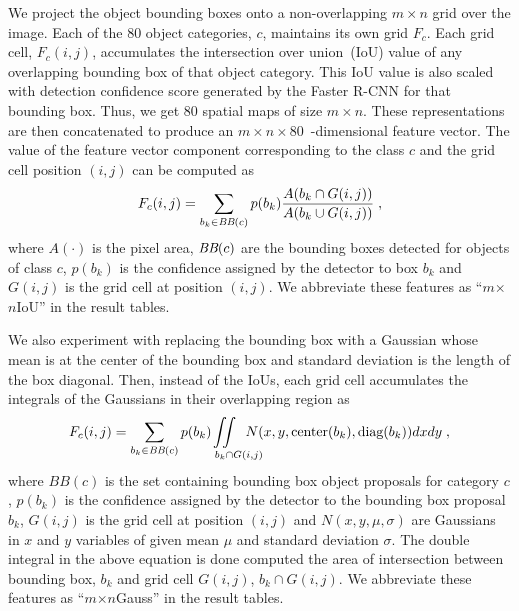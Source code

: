 We project the object bounding boxes onto a non-overlapping $m \times n$ grid
over the image.
Each of the 80 object categories, $c$, maintains its own grid $F_c$.
Each grid cell, $F_c(i,j)$, accumulates the intersection over union~(IoU) value
of any overlapping bounding box of that object category. 
This IoU value is also scaled with detection confidence score generated by the
Faster R-CNN for that bounding box.
Thus, we get 80 spatial maps of size $m\times n$. 
These representations are then concatenated to produce an $m\times
n\times80$~-dimensional feature vector.
The value of the feature vector component corresponding to the class $c$ and the
grid cell position $(i,j)$ can be computed as 
\begin{equation} 
\label{eqn:Iou} 
F_c(i,j) = \sum_{b_k \in \text{\it BB}(c)}p(b_k)\frac{ A(b_k \cap G(i,j))}{A(b_k \cup G(i,j))} \;, 
\end{equation}
where $A(\cdot)$ is the pixel area, $\text{\it BB}(c)$ are the bounding boxes
detected for objects of class $c$, $p(b_k)$ is the confidence assigned by the
detector to box $b_k$ and $G(i,j)$ is the grid cell at position $(i,j)$.
We abbreviate these features as ``$m$$\times${}$n$IoU'' in the result tables.

We also experiment with replacing the bounding box with a Gaussian whose mean is
at the center of the bounding box and standard deviation is the length of the
box diagonal.
Then, instead of the IoUs, each grid cell accumulates the integrals of the
Gaussians in their overlapping region as
\begin{equation} \label{eqn:Gauss} F_c(i,j) = \sum_{b_k \in \text{\it
        BB}(c)} p(b_k)\text{\hspace*{-7mm}}\iint\displaylimits_%
{\text{\hspace{9mm}}b_k \cap G(i,j)}\text{\hspace*{-5mm}}
N(x,y,\text{center}(b_k),\text{diag}(b_k)) dx dy \; , \end{equation}
\noindent where $BB(c)$ is the set containing bounding box object proposals for
category $c$, $p(b_k)$ is the confidence assigned by the detector to the
bounding box proposal $b_k$, $G(i,j)$ is the grid cell at position $(i,j)$ and
$N(x,y,\mu,\sigma)$ are Gaussians in $x$ and $y$ variables of given mean $\mu$
and standard deviation $\sigma$.
The double integral in the above equation is done computed the area of intersection
between bounding box, $b_k$ and grid cell $G(i,j)$, $b_k \cap G(i,j)$.
We abbreviate these features as ``$m$$\times${}$n$Gauss'' in the result tables.

